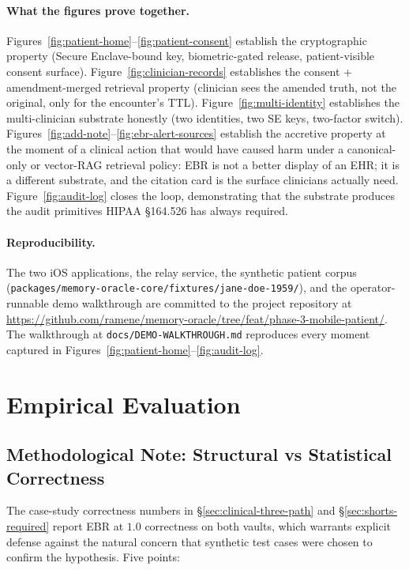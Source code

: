 \documentclass[runningheads]{llncs}
\begin{document}
\paragraph{What the figures prove together.}
Figures~\ref{fig:patient-home}--\ref{fig:patient-consent} establish
the cryptographic property (Secure Enclave-bound key, biometric-gated
release, patient-visible consent surface).
Figure~\ref{fig:clinician-records} establishes the consent +
amendment-merged retrieval property (clinician sees the amended truth,
not the original, only for the encounter's TTL).
Figure~\ref{fig:multi-identity} establishes the multi-clinician
substrate honestly (two identities, two SE keys, two-factor switch).
Figures~\ref{fig:add-note}--\ref{fig:ebr-alert-sources} establish the
accretive property at the moment of a clinical action that would have
caused harm under a canonical-only or vector-RAG retrieval policy:
EBR is not a better display of an EHR; it is a different substrate,
and the citation card is the surface clinicians actually need.
Figure~\ref{fig:audit-log} closes the loop, demonstrating that the
substrate produces the audit primitives HIPAA \S164.526 has always
required.

\paragraph{Reproducibility.} The two iOS applications, the relay
service, the synthetic patient corpus
(\texttt{packages/memory-oracle-core/fixtures/jane-doe-1959/}), and the
operator-runnable demo walkthrough are committed to the project
repository at
\url{https://github.com/ramene/memory-oracle/tree/feat/phase-3-mobile-patient/}.
The walkthrough at \texttt{docs/DEMO-WALKTHROUGH.md} reproduces every
moment captured in Figures~\ref{fig:patient-home}--\ref{fig:audit-log}.

\section{Empirical Evaluation}
\label{sec:empirical}

\subsection{Methodological Note: Structural vs Statistical Correctness}
\label{sec:methodological-note}

The case-study correctness numbers in \S\ref{sec:clinical-three-path} and
\S\ref{sec:shorts-required} report EBR at $1.0$ correctness on both vaults,
which warrants explicit defense against the natural concern that synthetic
test cases were chosen to confirm the hypothesis. Five points:
\end{document}
